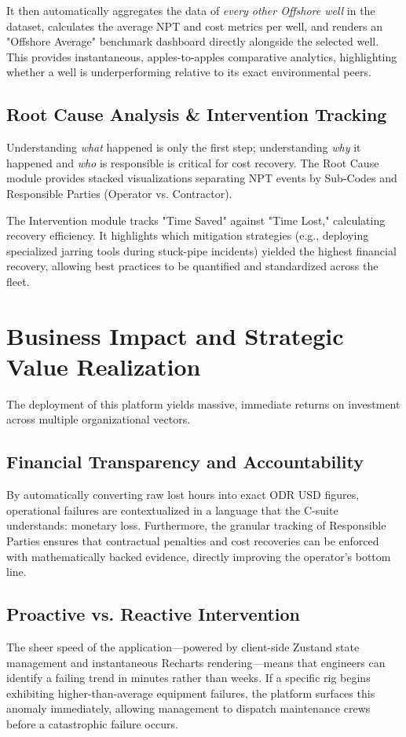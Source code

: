 \documentclass[11pt,a4paper]{article}
\begin{document}
It then automatically aggregates the data of \textit{every other Offshore well} in the dataset, calculates the average NPT and cost metrics per well, and renders an "Offshore Average" benchmark dashboard directly alongside the selected well. This provides instantaneous, apples-to-apples comparative analytics, highlighting whether a well is underperforming relative to its exact environmental peers.

\subsection{Root Cause Analysis \& Intervention Tracking}
Understanding \textit{what} happened is only the first step; understanding \textit{why} it happened and \textit{who} is responsible is critical for cost recovery. The Root Cause module provides stacked visualizations separating NPT events by Sub-Codes and Responsible Parties (Operator vs. Contractor).

The Intervention module tracks "Time Saved" against "Time Lost," calculating recovery efficiency. It highlights which mitigation strategies (e.g., deploying specialized jarring tools during stuck-pipe incidents) yielded the highest financial recovery, allowing best practices to be quantified and standardized across the fleet.

\section{Business Impact and Strategic Value Realization}
The deployment of this platform yields massive, immediate returns on investment across multiple organizational vectors.

\subsection{Financial Transparency and Accountability}
By automatically converting raw lost hours into exact ODR USD figures, operational failures are contextualized in a language that the C-suite understands: monetary loss. Furthermore, the granular tracking of Responsible Parties ensures that contractual penalties and cost recoveries can be enforced with mathematically backed evidence, directly improving the operator's bottom line.

\subsection{Proactive vs. Reactive Intervention}
The sheer speed of the application—powered by client-side Zustand state management and instantaneous Recharts rendering—means that engineers can identify a failing trend in minutes rather than weeks. If a specific rig begins exhibiting higher-than-average equipment failures, the platform surfaces this anomaly immediately, allowing management to dispatch maintenance crews before a catastrophic failure occurs.
\end{document}
